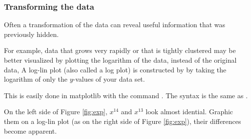 \subsubsection*{Transforming the data}

Often a transformation of the data can reveal useful information that was previously hidden.

For example, data that grows very rapidly or that is tightly clustered may be better visualized by plotting the logarithm of the data, instead of the original data, A log-lin plot (also called a log plot) is constructed by by taking the logarithm of only the $y$-values of your data set. 

This is easily done in matplotlib with the command .  The syntax is the same as .

On the left side of Figure \ref{fig:exp}, $x^{14}$ and $x^{13}$ look almost idential. Graphic them on a log-lin plot (as on the right side of Figure \ref{fig:exp}), their differences become apparent. 

